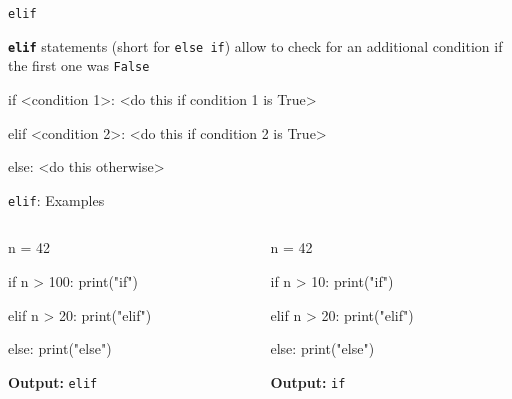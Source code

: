 \begin{frame}[fragile]{\texttt{elif}}

    \begin{block}{}
        \textbf{\texttt{elif}} statements (short for \texttt{else if}) allow to check for an additional condition if the first one was \texttt{False}
    \end{block}

    \begin{pythoncode}
        if <condition 1>:
            <do this if condition 1 is True>

        elif <condition 2>:
            <do this if condition 2 is True>

        else:
            <do this otherwise>
    \end{pythoncode}

\end{frame}

\begin{frame}[fragile]{\texttt{elif}: Examples}

    \begin{columns}[totalwidth = \textwidth, T]

    \begin{column}{0.5\textwidth}

        \begin{pythoncode}
n = 42

if n > 100:
    print("if")

elif n > 20:
    print("elif")

else:
    print("else")
        \end{pythoncode}

        \pause
        \vspace{1em}

        \textbf{Output:} \texttt{elif}

    \end{column}

    \pause

    \begin{column}{0.5\textwidth}

        \begin{pythoncode}
n = 42

if n > 10:
    print("if")

elif n > 20:
    print("elif")

else:
    print("else")
        \end{pythoncode}

        \pause
        \vspace{1em}

        \textbf{Output:} \texttt{if}

    \end{column}

    \end{columns}

\end{frame}

